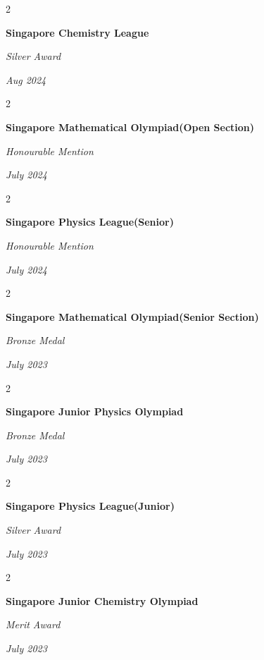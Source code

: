 \documentclass[10pt, letterpaper]{article}
\newenvironment{twocolentry}[2][]{
    \onecolentry
    \def\secondColumn{#2}
    \setcolumnwidth{\fill, 4.5 cm}
    \begin{paracol}{2}
}{
    \switchcolumn \raggedleft \secondColumn
    \end{paracol}
    \endonecolentry
} %
\begin{document}
  \begin{twocolentry}{
            
            
        \textit{Aug 2024}}
            \textbf{Singapore Chemistry League}

            \textit{Silver Award}

        \end{twocolentry}



 \begin{twocolentry}{
            
            
        \textit{July 2024 }}
            \textbf{Singapore Mathematical Olympiad(Open Section)}

            \textit{Honourable Mention}

        \end{twocolentry}

\begin{twocolentry}{
            
            
        \textit{July 2024 }}
            \textbf{Singapore Physics League(Senior)}

            \textit{Honourable Mention}

        \end{twocolentry}

        \begin{twocolentry}{
            
            
        \textit{July 2023 }}
            \textbf{Singapore Mathematical Olympiad(Senior Section)}

            \textit{Bronze Medal}

        \end{twocolentry}

 \begin{twocolentry}{
            
            
        \textit{July 2023 }}
            \textbf{Singapore Junior Physics Olympiad}

            \textit{Bronze Medal}

        \end{twocolentry}

        \begin{twocolentry}{
            
            
        \textit{July 2023 }}
            \textbf{Singapore Physics League(Junior)}

            \textit{Silver Award}

        \end{twocolentry}
\begin{twocolentry}{
\textit{July 2023 }}
            \textbf{Singapore Junior Chemistry Olympiad}

            \textit{Merit Award}

        \end{twocolentry}
\end{document}
